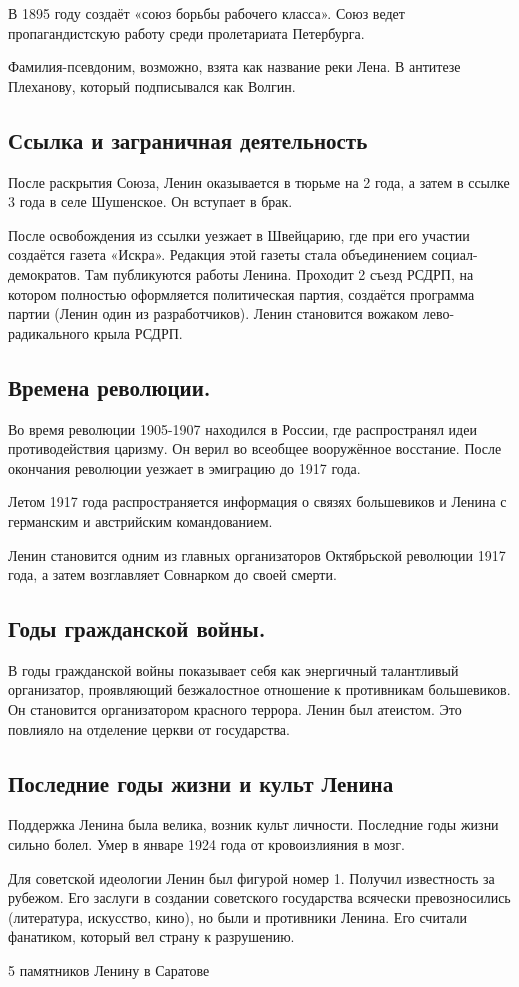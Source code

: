 В 1895 году создаёт «союз борьбы рабочего класса». Союз ведет пропагандистскую работу среди пролетариата Петербурга. 

Фамилия-псевдоним, возможно, взята как название реки Лена. В антитезе Плеханову, который подписывался как Волгин.

\subsection{Ссылка и заграничная деятельность}

После раскрытия Союза, Ленин оказывается в тюрьме на 2 года, а затем в ссылке 3 года в селе Шушенское. Он вступает в брак.

После освобождения из ссылки уезжает в Швейцарию, где при его участии создаётся газета «Искра». Редакция этой газеты стала объединением социал-демократов. Там публикуются работы Ленина. Проходит 2 съезд РСДРП, на котором полностью оформляется политическая партия, создаётся программа партии (Ленин один из разработчиков). Ленин становится вожаком лево-радикального крыла РСДРП.

\subsection{Времена революции.}

Во время революции 1905-1907 находился в России, где распространял идеи противодействия царизму. Он верил во всеобщее вооружённое восстание. После окончания революции уезжает в эмиграцию до 1917 года.

Летом 1917 года распространяется информация о связях большевиков и Ленина с германским и австрийским командованием.

Ленин становится одним из главных организаторов Октябрьской революции 1917 года, а затем возглавляет Совнарком до своей смерти.

\subsection{Годы гражданской войны.}

В годы гражданской войны показывает себя как энергичный талантливый организатор, проявляющий безжалостное отношение к противникам большевиков. Он становится организатором красного террора. Ленин был атеистом. Это повлияло на отделение церкви от государства.

\subsection{Последние годы жизни и культ Ленина}

Поддержка Ленина была велика, возник культ личности.
Последние годы жизни сильно болел. Умер в январе 1924 года от кровоизлияния в мозг.

Для советской идеологии Ленин был фигурой номер 1. Получил известность за рубежом. Его заслуги в создании советского государства всячески превозносились (литература, искусство, кино), но были и противники Ленина. Его считали фанатиком, который вел страну к разрушению.

5 памятников Ленину в Саратове